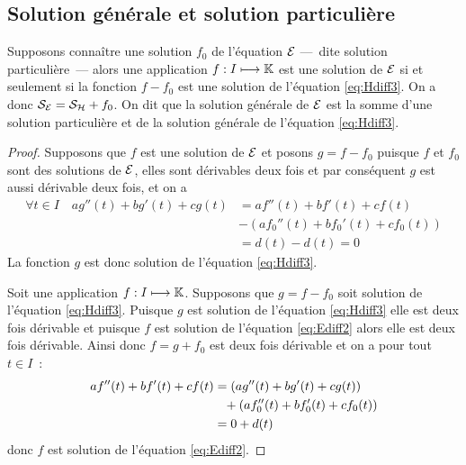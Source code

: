 \subsection{Solution générale et solution particulière}
\label{subsec:solutiongeneraleetsolutionpart}
\begin{theo}
Supposons connaître une solution $f_0$ de l'équation $\mathcal{E}$ ---~dite solution particulière~--- alors une application $f:I \longmapsto \mathbb{K}$ est une solution de $\mathcal{E}$ si et seulement si la fonction $f-f_0$ est une solution de l'équation \eqref{eq:Hdiff3}. On a donc $\mathcal{S}_{\mathcal{E}}=\mathcal{S}_{\mathcal{H}} + f_0$. On dit que la solution générale de $\mathcal{E}$ est la somme d'une solution particulière et de la solution générale de l'équation \eqref{eq:Hdiff3}.
\end{theo}
\begin{proof}
  Supposons que $f$ est une solution de $\mathcal{E}$ et posons $g=f-f_0$ puisque $f$ et $f_0$ sont des solutions de $\mathcal{E}$, elles sont dérivables deux fois et par conséquent $g$ est aussi dérivable deux fois, et on a
  \begin{align}
    \forall t \in I \quad ag''(t)+bg'(t)+cg(t) &= af''(t)+bf'(t)+cf(t) \\ &- (af_0''(t)+bf_0'(t)+cf_0(t))\\ &= d(t)-d(t)=0
  \end{align}
La fonction $g$ est donc solution de l'équation \eqref{eq:Hdiff3}.

Soit une application $f:I \longmapsto \mathbb{K}$. Supposons que $g=f-f_0$ soit solution de l'équation \eqref{eq:Hdiff3}. Puisque $g$ est solution de l'équation \eqref{eq:Hdiff3} elle est deux fois dérivable et puisque $f$ est solution de l'équation \eqref{eq:Ediff2} alors elle est deux fois dérivable. Ainsi donc $f=g+f_0$ est deux fois dérivable et on a pour tout $t \in I$~:
\begin{align}
  af''(t)+bf'(t)+cf(t)&=(ag''(t)+bg'(t)+cg(t))\notag\\ &\phantom{=}+(af_0''(t)+bf_0'(t)+cf_0(t))\\ &=0+d(t) 
\end{align}
donc $f$ est solution de l'équation \eqref{eq:Ediff2}.
\end{proof}
